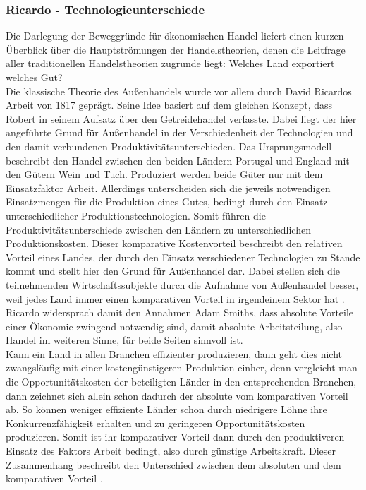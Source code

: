 \subsubsection*{Ricardo - Technologieunterschiede}
Die Darlegung der Beweggründe für ökonomischen Handel liefert einen kurzen Überblick über die Hauptströmungen der Handelstheorien, denen die Leitfrage aller traditionellen Handelstheorien zugrunde liegt: Welches Land exportiert welches Gut? \\
%
Die klassische Theorie des Außenhandels wurde vor allem durch David Ricardos Arbeit von 1817 geprägt. Seine Idee basiert auf dem gleichen Konzept, dass Robert \cite{Torrens.1815} in seinem Aufsatz über den Getreidehandel verfasste. Dabei liegt der hier angeführte Grund für Außenhandel in der Verschiedenheit der Technologien und den damit verbundenen Produktivitätsunterschieden. Das Ursprungsmodell beschreibt den Handel zwischen den beiden Ländern Portugal und England mit den Gütern Wein und Tuch. Produziert werden beide Güter nur mit dem Einsatzfaktor Arbeit.  Allerdings unterscheiden sich die jeweils notwendigen Einsatzmengen für die Produktion eines Gutes, bedingt durch den Einsatz unterschiedlicher Produktionstechnologien. Somit führen die Produktivitätsunterschiede zwischen den Ländern zu unterschiedlichen Produktionskosten. Dieser komparative Kostenvorteil beschreibt den relativen Vorteil eines Landes, der durch den Einsatz verschiedener Technologien zu Stande kommt und stellt hier den Grund für Außenhandel dar. Dabei stellen sich die teilnehmenden Wirtschaftssubjekte durch die Aufnahme von Außenhandel besser, weil jedes Land immer einen komparativen Vorteil in irgendeinem Sektor hat \cite{Ricardo.1817}. \\
%
 Ricardo widersprach damit den Annahmen Adam Smiths, dass absolute Vorteile einer Ökonomie zwingend notwendig sind, damit absolute Arbeitsteilung, also Handel im weiteren Sinne, für beide Seiten sinnvoll ist.\\
%
Kann ein Land in allen Branchen effizienter produzieren, dann geht dies nicht zwangsläufig mit einer kostengünstigeren Produktion einher, denn vergleicht man die Opportunitätskosten der beteiligten Länder in den entsprechenden Branchen, dann zeichnet sich allein schon dadurch der absolute vom komparativen Vorteil ab. So können weniger effiziente Länder schon durch niedrigere Löhne ihre Konkurrenzfähigkeit erhalten und zu geringeren Opportunitätskosten produzieren. Somit ist ihr komparativer Vorteil dann durch den produktiveren Einsatz des Faktors Arbeit bedingt, also durch günstige Arbeitskraft. Dieser Zusammenhang beschreibt den Unterschied zwischen dem absoluten und dem komparativen Vorteil \cite{Ricardo.1817}.\\
